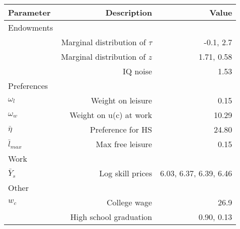 \begin{tabular}{lrr}
\hline
Parameter & Description  & Value  \\ 
\hline
Endowments &   &   \\ 
 & Marginal distribution of $\tau$  & -0.1, 2.7  \\ 
 & Marginal distribution of $z$  & 1.71, 0.58  \\ 
 & IQ noise  & 1.53  \\ 
Preferences &   &   \\ 
$\omega_{l}$ & Weight on leisure  & 0.15  \\ 
$\omega_{w}$ & Weight on u(c) at work  & 10.29  \\ 
$\bar{\eta}$ & Preference for HS  & 24.80  \\ 
$\bar{l}_{max}$ & Max free leisure  & 0.15  \\ 
Work &   &   \\ 
$\bar{Y}_{s}$ & Log skill prices  & 6.03, 6.37, 6.39, 6.46  \\ 
Other &   &   \\ 
$w_{c}$ & College wage  & 26.9  \\ 
 & High school graduation  & 0.90, 0.13  \\ 
\hline
\end{tabular}%
